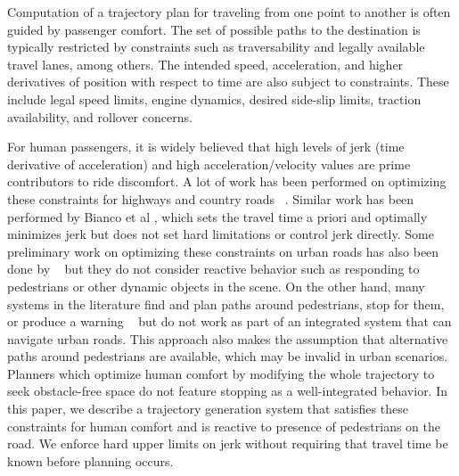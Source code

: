 \documentclass[letterpaper, 10 pt, conference]{ieeeconf}  %
\begin{document}
Computation of a trajectory plan for traveling from one point to another is often guided by
passenger comfort. The set of possible paths to the destination is typically restricted 
by constraints such as traversability and legally available travel lanes, among others.
The intended speed, acceleration, and higher derivatives of position with respect to time are also subject to constraints.
These include legal speed limits, engine dynamics, desired side-slip limits, traction availability, and rollover concerns.

For human passengers, it is widely believed that high levels of jerk (time derivative of acceleration) and high acceleration/velocity values are prime contributors to ride discomfort.
A lot of work has been performed on optimizing these constraints for highways and country roads ~\cite{ziegler14,bahram15,xu12,CHEB15CI}.
Similar work has been performed by Bianco et al \cite{GuarinoLoBianco2004,GuarinoLoBianco2005,Bianco2007,Bianco2009,GuarinoLoBianco2013}, which sets the travel time a priori and optimally minimizes jerk but does not set hard limitations or control jerk directly.
Some preliminary work on optimizing these constraints on urban roads has also been done by ~\cite{Rastelli14,Li15} but they do not consider reactive behavior such as responding to pedestrians or other dynamic objects in the scene.
On the other hand, many systems in the literature find and plan paths around pedestrians, stop for them, or produce a warning ~\cite{pradalier05,benenson06,gu14,mogelmose15,johnson13} but do not work as part of an integrated system that can navigate urban roads.
This approach also makes the assumption that alternative paths around pedestrians are available, which may be invalid in urban scenarios.
Planners which optimize human comfort by modifying the whole trajectory to seek obstacle-free space \cite{Villagra2012,Villagra2012a} do not feature stopping as a well-integrated behavior.
In this paper, we describe a trajectory generation system that satisfies these constraints for human comfort and is reactive to presence of pedestrians on the road. We enforce hard upper limits on jerk without requiring that travel time be known before planning occurs.
\end{document}
